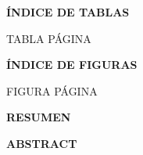 \documentclass[12pt]{article}
\begin{document}
\newpage

\begin{center}
{\fontsize{14}{14}\selectfont \bf ÍNDICE DE TABLAS}\\
\end{center}
{}

\begin{flushright} \small
TABLA \hspace{11.6cm} PÁGINA\\
\end{flushright}

\vspace{-1.0cm}

\begin{spacing}{1.2}
{\fontsize{10}{10}\selectfont \listoftables}
\end{spacing}

\newpage

\begin{center}
{\fontsize{14}{14}\selectfont \bf ÍNDICE DE FIGURAS}\\
\end{center}
{}


\begin{flushright} \small
FIGURA \hspace{11.45cm} PÁGINA\\
\end{flushright}

\vspace{-1.0cm}

\begin{spacing}{1.2}
{\fontsize{10}{10}\selectfont \listoffigures}
\end{spacing}

\newpage


\begin{center}
{\fontsize{14}{14}\selectfont \bf RESUMEN}\\
\end{center}
{}



\newpage

\begin{center}
{\fontsize{14}{14}\selectfont \bf ABSTRACT}\\
\end{center}
{}
\end{document}
